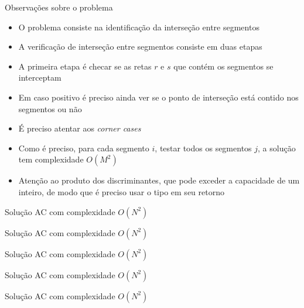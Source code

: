 \begin{frame}[fragile]{Observações sobre o problema}

    \begin{itemize}
        \item O problema consiste na identificação da interseção entre segmentos

        \item A verificação de interseção entre segmentos consiste em duas etapas

        \item A primeira etapa é checar se as retas $r$ e $s$ que contém os segmentos se
            interceptam

        \item Em caso positivo é preciso ainda ver se o ponto de interseção está contido nos 
            segmentos ou não

        \item É preciso atentar aos \textit{corner cases}

        \item Como é preciso, para cada segmento $i$,  testar todos os segmentos $j$, a
            solução tem complexidade $O(M^2)$

        \item Atenção ao produto dos discriminantes, que pode exceder a capacidade de um
            inteiro, de modo que é preciso usar o tipo  em seu retorno
    \end{itemize}

\end{frame}

\begin{frame}[fragile]{Solução AC com complexidade $O(N^2)$}
\end{frame}

\begin{frame}[fragile]{Solução AC com complexidade $O(N^2)$}
\end{frame}

\begin{frame}[fragile]{Solução AC com complexidade $O(N^2)$}
\end{frame}

\begin{frame}[fragile]{Solução AC com complexidade $O(N^2)$}
\end{frame}

\begin{frame}[fragile]{Solução AC com complexidade $O(N^2)$}
\end{frame}
